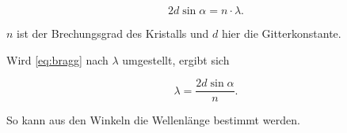 \begin{equation}
    2 d \sin{\alpha} = n \cdot \lambda.
    \label{eq:bragg}
\end{equation}

$n$ ist der Brechungsgrad des Kristalls und $d$ hier die Gitterkonstante.

Wird \autoref{eq:bragg} nach $\lambda$ umgestellt, ergibt sich 

\begin{equation}
   \lambda = \frac{2 d \sin{\alpha}}{n}.
   \label{eq:lambda}
\end{equation}

So kann aus den Winkeln die Wellenlänge bestimmt werden.
